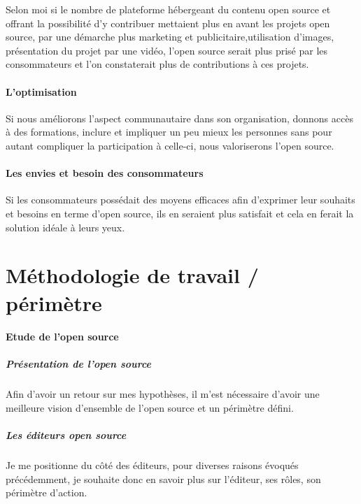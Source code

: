 			Selon moi si le nombre de plateforme hébergeant du contenu open source et offrant la possibilité d'y contribuer mettaient plus en avant les projets open source, par une démarche plus marketing et publicitaire,utilisation d'images, présentation du projet par une vidéo, l'open source serait plus prisé par les consommateurs et l'on constaterait plus de contributions à ces projets.

		\paragraph{L'optimisation\\}

			Si nous améliorons l'aspect communautaire dans son organisation, donnons accès à des formations, inclure et impliquer un peu mieux les personnes sans pour autant compliquer la participation à celle-ci, nous valoriserons l'open source.

		\paragraph{Les envies et besoin des consommateurs\\}

			Si les consommateurs possédait des moyens efficaces afin d'exprimer leur souhaits et besoins en terme d'open source, ils en seraient plus satisfait et cela en ferait la solution idéale à leurs yeux.

	\section{Méthodologie de travail / périmètre}
		\paragraph{Etude de l'open source}

			\subparagraph{Présentation de l'open source\\}

				Afin d'avoir un retour sur mes hypothèses, il m'est nécessaire d'avoir une meilleure vision d'ensemble de l'open source et un périmètre défini.

			\subparagraph{Les éditeurs open source\\}

				Je me positionne du côté des éditeurs, pour diverses raisons évoqués précédemment, je souhaite donc en savoir plus sur l'éditeur, ses rôles, son périmètre d'action.

